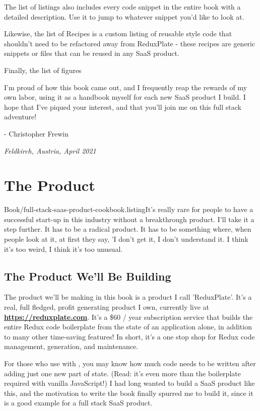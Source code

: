 \documentclass[a4paper,headinclude=on,footinclude=on,12pt,oneside]{scrbook}
\newcommand{\link}[2]{\textbf{\textcolor{monokaiPink}{\href{#2}{#1}}}}
\begin{document}
The list of listings also includes every code snippet in the entire book with a detailed description. Use it to jump to whatever snippet you'd like to look at.

Likewise, the list of Recipes is a custom listing of reusable style code that shouldn't need to be refactored away from ReduxPlate - these recipes are generic snippets or files that can be reused in any SaaS product.

Finally, the list of figures


I'm proud of how this book came out, and I frequently reap the rewards of my own labor, using it as a handbook myself for each new SaaS product I build. I hope that I've piqued your interest, and that you'll join me on this full stack adventure!

- Christopher Frewin

\textit{Feldkirch, Austria, April 2021}

\chapter{The Product}
Book/full-stack-saas-product-cookbook.listing{It's really rare for people to have a successful start-up in this industry without a breakthrough product. I'll take it a step further. It has to be a radical product. It has to be something where, when people look at it, at first they say, 'I don't get it, I don't understand it. I think it's too weird, I think it's too unusual.
} %

\section{The Product We'll Be Building}

The product we'll be making in this book is a product I call 'ReduxPlate'. It's a real, full fledged, profit generating product I own, currently live at \link{https://reduxplate.com}{https://reduxplate.com}. It's a \$60 / year subscription service that builds the entire Redux code boilerplate from the state of an application alone, in addition to many other time-saving features! In short, it's a one stop shop for Redux code management, generation, and maintenance.

For those who use  with , you may know how much code needs to be written after adding just one new part of state. (Read: it's even more than the boilerplate required with vanilla JavaScript!) I had long wanted to build a SaaS product like this, and the motivation to write the book finally spurred me to build it, since it is a good example for a full stack SaaS product. 
\end{document}
